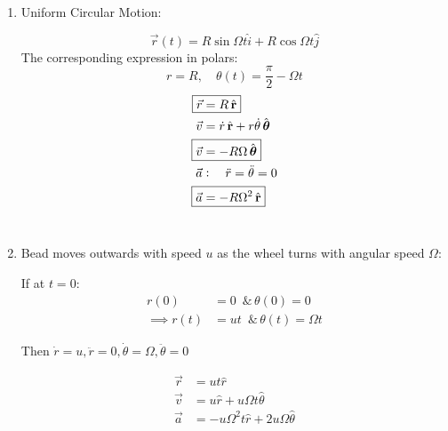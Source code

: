 \documentclass[10pt]{scrartcl}
\begin{document}
\begin{examples}
\begin{enumerate}
  \item Uniform Circular Motion:
  
  \[\vec{r}(t) = R\sin\Omega t\hat{i} + R\cos\Omega t \hat{j}\]
  The corresponding expression in polars:
  \[r = R,\quad \theta(t) = \frac{\pi}{2} - \Omega t\]
  \[
\begin{aligned}
  \Aboxed{\vec{r} &= R\hat{r}}\\
  \vec{v} &= \dot{r}\hat{r} + r\dot{\theta}\hat{\theta}\\
  \Aboxed{\vec{v} &= -R\Omega\hat{\theta}}\\
  \vec{a} &: \quad \ddot{r} = \ddot{\theta} = 0\\
  \Aboxed{\vec{a} &= -R\Omega^2\hat{r}}
\end{aligned}
\]~\\

\item Bead moves outwards with speed $u$ as the wheel turns with angular speed $\Omega$:
\begin{center}
\end{center}

If at $t=0$:
\[\begin{aligned}
r(0) &= 0 \,\text{ \& }\, \theta(0) = 0\\
\implies r(t) &= ut \,\text{ \& }\, \theta(t) = \Omega t	
\end{aligned}
\]

Then $\dot{r} = u, \ddot{r} = 0, \dot{\theta} = \Omega, \ddot{\theta} = 0$

\[
\begin{aligned}
  \vec{r} &= ut\hat{r}\\
  \vec{v} &= u\hat{r} + u\Omega t\hat{\theta}\\
  \vec{a} &= -u\Omega^2t\hat{r} + 2u\Omega\hat{\theta}
\end{aligned}
\]
\end{enumerate}
\end{examples}
\end{document}
